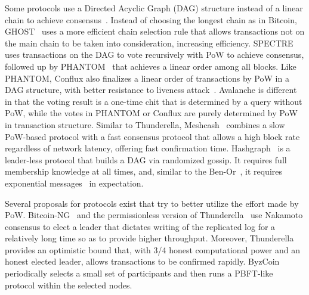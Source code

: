 {Some protocols use a Directed Acyclic Graph (DAG) structure instead of a linear chain to achieve
consensus~\cite{SompolinskyZ15,SompolinskyLZ16,SompolinskyZ18,BentovHMN17,baird2016hashgraph}.
Instead of choosing the longest chain as in Bitcoin,
GHOST~\cite{SompolinskyZ15} uses a more efficient chain selection rule that
allows transactions not on the main chain to be taken into consideration, increasing efficiency.
SPECTRE~\cite{SompolinskyLZ16} uses transactions on
the DAG to vote recursively with PoW to achieve consensus, followed up by
PHANTOM~\cite{SompolinskyZ18} that achieves a linear order among all blocks.
Like PHANTOM, Conflux also finalizes a linear order of transactions by PoW
in a DAG structure, with better resistance to liveness attack~\cite{confluxLLXLC18}.
Avalanche
is different in that the voting result is a one-time chit that is determined by
a query without PoW, while the votes in PHANTOM or Conflux are purely determined by PoW in transaction structure.
Similar to Thunderella, Meshcash~\cite{BentovHMN17} combines a slow PoW-based protocol with a fast consensus protocol that allows a high block rate regardless of network latency, offering fast confirmation time.
Hashgraph~\cite{baird2016hashgraph} is a leader-less protocol that builds a DAG via randomized gossip.
It requires full membership knowledge at all times, and, similar to the Ben-Or~\cite{ben1983another}, it requires exponential messages~\cite{aspnes2003randomized,CachinV17} in expectation.
}{
Several proposals for protocols exist that try to
better utilize the effort made by PoW.
Bitcoin-NG~\cite{EyalGSR16} and the permissionless version of
Thunderella~\cite{PassS18} use Nakamoto consensus to elect a leader that
dictates writing of the replicated log for a relatively long time so as to
provide higher throughput. Moreover, Thunderella provides an
optimistic bound that, with 3/4 honest computational power and an honest
elected leader, allows transactions to be confirmed rapidly.
ByzCoin~\cite{Kokoris-KogiasJ16} periodically selects a small set of
participants and then runs a PBFT-like protocol within the selected nodes. 

}
